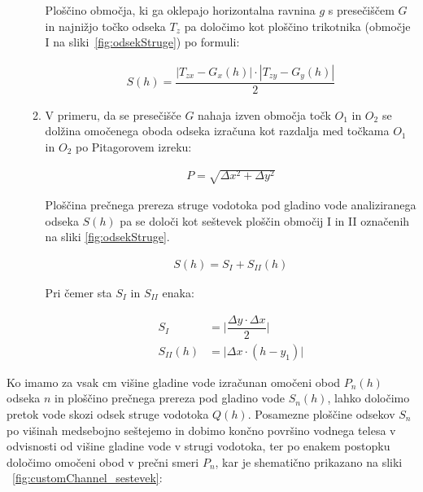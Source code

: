 \begin{enumerate}
\begin{enumerate}
	
	Ploščino območja, ki ga oklepajo horizontalna ravnina $g$ s presečiščem $G$ in najnižjo točko odseka $T_z$ pa določimo kot ploščino trikotnika (območje I na sliki~\ref{fig:odsekStruge}) po formuli:
	
	\begin{ceqn}
		\begin{align}
		S(h) = \dfrac{|T_{zx} - G_x(h)| \cdot |T_{zy} - G_y(h)|}{2}
		\end{align}
	\end{ceqn}
	
	
	\item V primeru, da se presečišče $G$ nahaja izven območja točk $O_1$ in $O_2$ se dolžina omočenega oboda odseka izračuna kot razdalja med točkama $O_1$ in $O_2$ po Pitagorovem izreku:
	
	\begin{ceqn}
		\begin{align}
		P = \sqrt{ \Delta x^{2} + \Delta y^{2}}
		\end{align}
	\end{ceqn}
	
	Ploščina prečnega prereza struge vodotoka pod gladino vode analiziranega odseka $S(h)$ pa se določi kot seštevek ploščin območij I in II označenih na sliki \ref{fig:odsekStruge}.
	
	\begin{ceqn}
		\begin{align}
		S(h) = S_I + S_{II}(h)
		\end{align}
	\end{ceqn}
	
	Pri čemer sta $S_I$ in $S_{II}$ enaka:
	
		\begin{ceqn}
			\begin{align}
			S_I&= \bigg|\dfrac{ \Delta y \cdot  \Delta x}{2}\bigg|\\
			S_{II}(h)&= \bigg|\Delta x \cdot (h - y_1)\bigg|
			\end{align}
		\end{ceqn}
		
			
		
	\end{enumerate}

\end{enumerate}







Ko imamo za vsak cm višine gladine vode izračunan omočeni obod $P_n(h)$ odseka $n$ in ploščino prečnega prereza pod gladino vode $S_n(h)$, lahko določimo pretok vode skozi odsek struge vodotoka $Q(h)$. Posamezne ploščine odsekov $S_n$ po višinah medsebojno seštejemo in dobimo končno površino vodnega telesa v odvisnosti od višine gladine vode v strugi vodotoka, ter po enakem postopku določimo omočeni obod v prečni smeri $P_n$, kar je shematično prikazano na sliki ~\ref{fig:customChannel_sestevek}:


